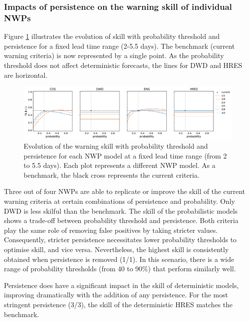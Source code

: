 \documentclass{ametsocV6.1}
\begin{document}
\subsubsection{Impacts of persistence on the warning skill of individual NWPs}
\label{sec:NWP_persistence}

Figure \ref{fig:NWP_skill_probability} illustrates the evolution of skill with probability threshold and persistence for a fixed lead time range (2-5.5 days). The benchmark (current warning criteria) is now represented by a single point. As the probability threshold does not affect deterministic forecasts, the lines for DWD and HRES are horizontal.

\begin{figure}
    \centering
    \includegraphics[width=1\textwidth]{figure03.pdf}
    \caption{Evolution of the warning skill with probability threshold and persistence  for each NWP model at a fixed lead time range (from 2 to 5.5 days). Each plot represents a different NWP model. As a benchmark, the black cross represents the current criteria.}
    \label{fig:NWP_skill_probability}
\end{figure}

Three out of four NWPs are able to replicate or improve the skill of the current warning criteria at certain combinations of persistence and probability. Only DWD is less skilful than the benchmark. The skill of the probabilistic models shows a trade-off between probability threshold and persistence. Both criteria play the same role of removing false positives by taking stricter values. Consequently, stricter persistence necessitates lower probability thresholds to optimise skill, and vice versa. Nevertheless, the highest skill is consistently obtained when persistence is removed (1/1). In this scenario, there is a wide range of probability thresholds (from 40 to 90\%) that perform similarly well.

Persistence does have a significant impact in the skill of deterministic models, improving dramatically with the addition of any persistence. For the most stringent persistence (3/3), the skill of the deterministic HRES matches the benchmark.
\end{document}
